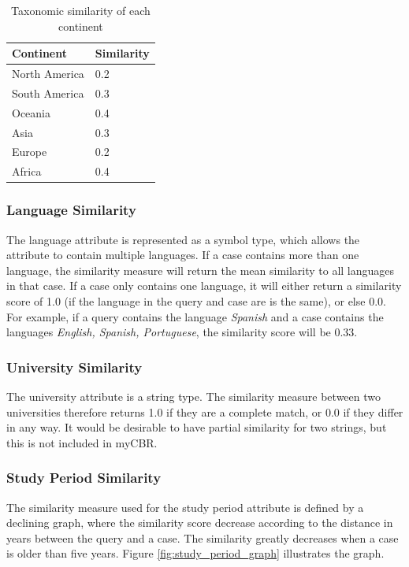 \begin{table}[h]
\centering
\caption{Taxonomic similarity of each continent}
\label{tab:taxonomic_continent_similarity}
\begin{tabulary}{\textwidth}{|L|L|}
\hline
\textbf{Continent} & \textbf{Similarity} \\ \hline \hline
North America & 0.2 \\ \hline
South America & 0.3 \\ \hline
Oceania & 0.4 \\ \hline
Asia & 0.3 \\ \hline
Europe & 0.2 \\ \hline
Africa & 0.4 \\ \hline
\end{tabulary}
\end{table}
    
\subsubsection{Language Similarity} 

The language attribute is represented as a symbol type, which allows the attribute to contain multiple languages. If a case contains more than one language, the similarity measure will return the mean similarity to all languages in that case. If a case only contains one language, it will either return a similarity score of 1.0 (if the language in the query and case are is the same), or else 0.0. For example, if a query contains the language \textit{Spanish} and a case contains the languages \textit{English, Spanish, Portuguese}, the similarity score will be 0.33.
    
\subsubsection{University Similarity} 

The university attribute is a string type. The similarity measure between two universities therefore returns 1.0 if they are a complete match, or 0.0 if they differ in any way. It would be desirable to have partial similarity for two strings, but this is not included in myCBR.
    
\subsubsection{Study Period Similarity} 

The similarity measure used for the study period attribute is defined by a declining graph, where the similarity score decrease according to the distance in years between the query and a case. The similarity greatly decreases when a case is older than five years. Figure \ref{fig:study_period_graph} illustrates the graph.
    
